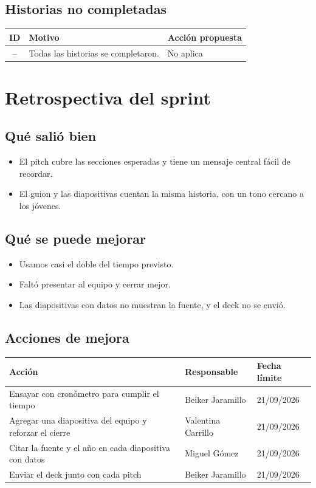 \documentclass[11pt,a4paper]{article}
\begin{document}
\subsection{Historias no completadas}
\begin{tabularx}{\textwidth}{c X X}
  \toprule
  \textbf{ID} & \textbf{Motivo} & \textbf{Acción propuesta} \\
  \midrule
  -- & Todas las historias se completaron. & No aplica \\
  \bottomrule
\end{tabularx}

\section{Retrospectiva del sprint}

\subsection{Qué salió bien}
\begin{itemize}[leftmargin=1.5em]
  \item {El pitch cubre las secciones esperadas y tiene un mensaje central fácil de recordar.}
  \item {El guion y las diapositivas cuentan la misma historia, con un tono cercano a los jóvenes.}
\end{itemize}

\subsection{Qué se puede mejorar}
\begin{itemize}[leftmargin=1.5em]
  \item {Usamos casi el doble del tiempo previsto.}
  \item {Faltó presentar al equipo y cerrar mejor.}
  \item {Las diapositivas con datos no muestran la fuente, y el deck no se envió.}
\end{itemize}

\subsection{Acciones de mejora}
\begin{tabularx}{\textwidth}{X l l}
  \toprule
  \textbf{Acción} & \textbf{Responsable} & \textbf{Fecha límite} \\
  \midrule
  Ensayar con cronómetro para cumplir el tiempo & Beiker Jaramillo & 21/09/2026 \\
  Agregar una diapositiva del equipo y reforzar el cierre & Valentina Carrillo & 21/09/2026 \\
  Citar la fuente y el año en cada diapositiva con datos & Miguel Gómez & 21/09/2026 \\
  Enviar el deck junto con cada pitch & Beiker Jaramillo & 21/09/2026 \\
  \bottomrule
\end{tabularx}
\end{document}
